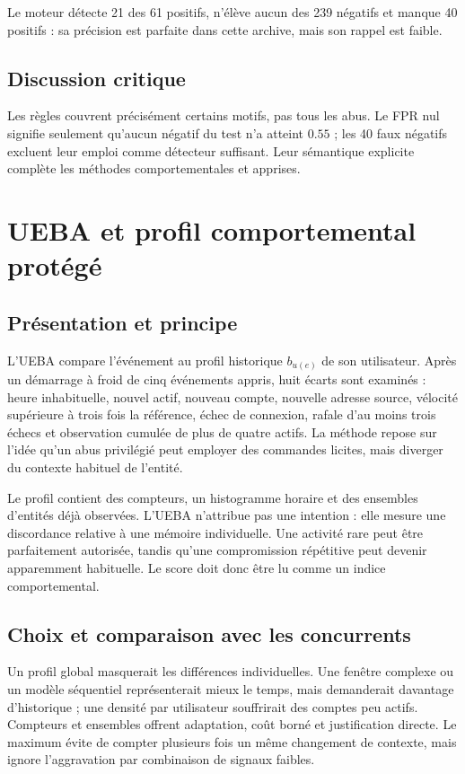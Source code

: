 \documentclass[11pt,a4paper,oneside]{report}
\theoremstyle{definition}
\theoremstyle{plain}
\begin{document}
Le moteur détecte 21 des 61 positifs, n'élève aucun des 239 négatifs et manque 40 positifs : sa précision est parfaite dans cette archive, mais son rappel est faible.

\subsection*{Discussion critique}

Les règles couvrent précisément certains motifs, pas tous les abus. Le FPR nul signifie seulement qu'aucun négatif du test n'a atteint $0.55$ ; les 40 faux négatifs excluent leur emploi comme détecteur suffisant. Leur sémantique explicite complète les méthodes comportementales et apprises.

\section{UEBA et profil comportemental protégé}
\label{sec:ai-ro-ueba}

\subsection*{Présentation et principe}

L'UEBA compare l'événement au profil historique $b_{u(e)}$ de son utilisateur. Après un démarrage à froid de cinq événements appris, huit écarts sont examinés : heure inhabituelle, nouvel actif, nouveau compte, nouvelle adresse source, vélocité supérieure à trois fois la référence, échec de connexion, rafale d'au moins trois échecs et observation cumulée de plus de quatre actifs. La méthode repose sur l'idée qu'un abus privilégié peut employer des commandes licites, mais diverger du contexte habituel de l'entité.

Le profil contient des compteurs, un histogramme horaire et des ensembles d'entités déjà observées. L'UEBA n'attribue pas une intention : elle mesure une discordance relative à une mémoire individuelle. Une activité rare peut être parfaitement autorisée, tandis qu'une compromission répétitive peut devenir apparemment habituelle. Le score doit donc être lu comme un indice comportemental.

\subsection*{Choix et comparaison avec les concurrents}

Un profil global masquerait les différences individuelles. Une fenêtre complexe ou un modèle séquentiel représenterait mieux le temps, mais demanderait davantage d'historique ; une densité par utilisateur souffrirait des comptes peu actifs. Compteurs et ensembles offrent adaptation, coût borné et justification directe. Le maximum évite de compter plusieurs fois un même changement de contexte, mais ignore l'aggravation par combinaison de signaux faibles.
\end{document}

